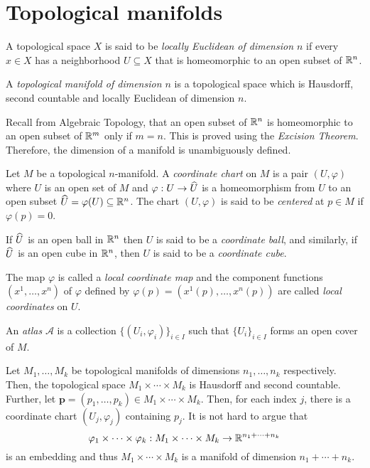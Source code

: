 \section{Topological manifolds}

\begin{definition}
    A topological space $X$ is said to be \emph{locally Euclidean of dimension $n$} if every $x\in X$ has a neighborhood $U\subseteq X$ that is homeomorphic to an open subset of $\mathbb{R}^n$.
\end{definition}

\begin{definition}[Manifold]
    A \emph{topological manifold of dimension $n$} is a topological space which is Hausdorff, second countable and locally Euclidean of dimension $n$.
\end{definition}

\begin{remark}
    Recall from Algebraic Topology, that an open subset of $\mathbb{R}^n$ is homeomorphic to an open subset of $\mathbb{R}^m$ only if $m = n$. This is proved using the \emph{Excision Theorem}. Therefore, the dimension of a manifold is unambiguously defined.
\end{remark}

\begin{definition}[Chart]
    Let $M$ be a topological $n$-manifold. A \emph{coordinate chart} on $M$ is a pair $(U,\varphi)$ where $U$ is an open set of $M$ and $\varphi: U\to\widehat{U}$ is a homeomorphism from $U$ to an open subset $\widehat{U} = \varphi(U)\subseteq\mathbb{R}^n$. The chart $(U,\varphi)$ is said to be \emph{centered} at $p\in M$ if $\varphi(p) = 0$.

    If $\widehat{U}$ is an open ball in $\mathbb{R}^n$ then $U$ is said to be a \emph{coordinate ball}, and similarly, if $\widehat{U}$ is an open cube in $\mathbb{R}^n$, then $U$ is said to be a \emph{coordinate cube}.

    The map $\varphi$ is called a \emph{local coordinate map} and the component functions $(x^1,\dots,x^n)$ of $\varphi$ defined by $\varphi(p) = (x^1(p),\dots,x^n(p))$ are called \emph{local coordinates} on $U$.

    An \emph{atlas} $\mathscr A$ is a collection $\{(U_i,\varphi_i)\}_{i\in I}$ such that $\{U_i\}_{i\in I}$ forms an open cover of $M$.
\end{definition}

\begin{example}
    Let $M_1,\ldots,M_k$ be topological manifolds of dimensions $n_1,\ldots,n_k$ respectively. Then, the topological space $M_1\times\cdots\times M_k$ is Hausdorff and second countable. Further, let $\mathbf p = (p_1,\ldots,p_k)\in M_1\times\cdots\times M_k$. Then, for each index $j$, there is a coordinate chart $(U_j,\varphi_j)$ containing $p_j$. It is not hard to argue that 
    \begin{equation*}
        \varphi_1\times\cdots\times\varphi_k: M_1\times\cdots\times M_k\to\mathbb{R}^{n_1 + \cdots + n_k}
    \end{equation*}
    is an embedding and thus $M_1\times\cdots\times M_k$ is a manifold of dimension $n_1 + \cdots + n_k$.
\end{example}

